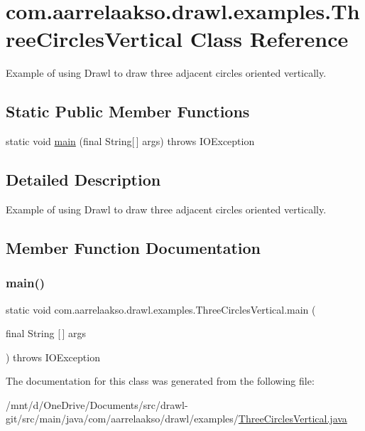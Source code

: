\hypertarget{classcom_1_1aarrelaakso_1_1drawl_1_1examples_1_1_three_circles_vertical}{}\section{com.\+aarrelaakso.\+drawl.\+examples.\+Three\+Circles\+Vertical Class Reference}
\label{classcom_1_1aarrelaakso_1_1drawl_1_1examples_1_1_three_circles_vertical}


Example of using Drawl to draw three adjacent circles oriented vertically.  


\subsection*{Static Public Member Functions}
\begin{DoxyCompactItemize}
\item 
static void \hyperlink{classcom_1_1aarrelaakso_1_1drawl_1_1examples_1_1_three_circles_vertical_aa93a6ab32c6fbd8f349ca853361f4523}{main} (final String\mbox{[}$\,$\mbox{]} args)  throws I\+O\+Exception 
\end{DoxyCompactItemize}


\subsection{Detailed Description}
Example of using Drawl to draw three adjacent circles oriented vertically. 

\subsection{Member Function Documentation}
\mbox{\label{classcom_1_1aarrelaakso_1_1drawl_1_1examples_1_1_three_circles_vertical_aa93a6ab32c6fbd8f349ca853361f4523}} 
\subsubsection{\texorpdfstring{main()}{main()}}
{\footnotesize\ttfamily static void com.\+aarrelaakso.\+drawl.\+examples.\+Three\+Circles\+Vertical.\+main (\begin{DoxyParamCaption}\item[{final String \mbox{[}$\,$\mbox{]}}]{args }\end{DoxyParamCaption}) throws I\+O\+Exception\hspace{0.3cm}{\ttfamily [static]}}



The documentation for this class was generated from the following file\+:\begin{DoxyCompactItemize}
\item 
/mnt/d/\+One\+Drive/\+Documents/src/drawl-\/git/src/main/java/com/aarrelaakso/drawl/examples/\hyperlink{_three_circles_vertical_8java}{Three\+Circles\+Vertical.\+java}\end{DoxyCompactItemize}
